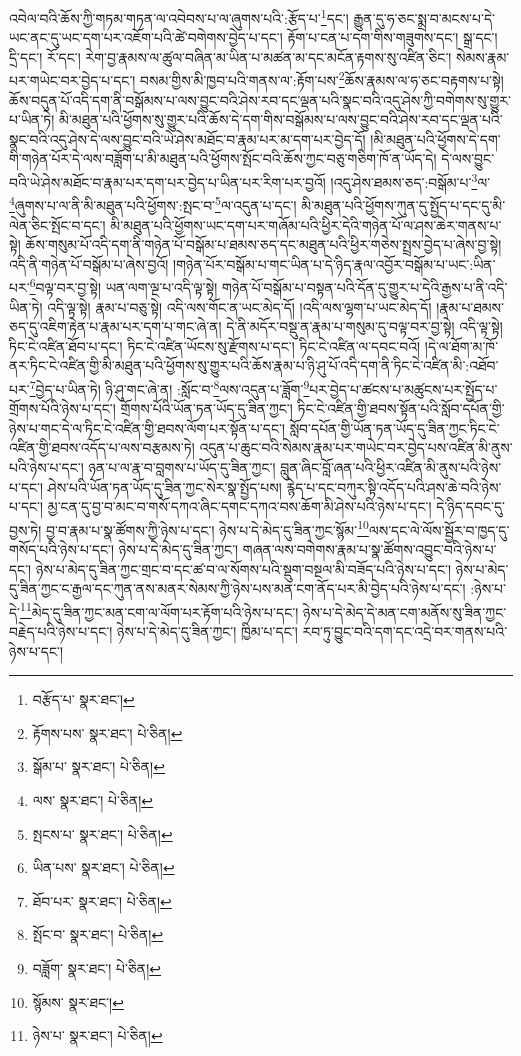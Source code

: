 འབེལ་བའི་ཆོས་ཀྱི་གཏམ་གཏན་ལ་འབེབས་པ་ལ་ཞུགས་པའི་:རྩོད་པ་\footnote{བརྩོད་པ་  སྣར་ཐང་། }དང་། རྒྱུན་དུ་ཧ་ཅང་སྨྲ་བ་མངས་པ་དེ་ཡང་ནང་དུ་ཡང་དག་པར་འཇོག་པའི་ཚེ་བགེགས་བྱེད་པ་དང་། རྟོག་པ་ངན་པ་དག་གིས་གཟུགས་དང་། སྒྲ་དང་། དྲི་དང་། རོ་དང་། རེག་བྱ་རྣམས་ལ་ཚུལ་བཞིན་མ་ཡིན་པ་མཚན་མ་དང་མངོན་རྟགས་སུ་འཛིན་ཅིང་། སེམས་རྣམ་པར་གཡེང་བར་བྱེད་པ་དང་། བསམ་གྱིས་མི་ཁྱབ་པའི་གནས་ལ་:རྟོག་པས་\footnote{རྟོགས་པས་  སྣར་ཐང་།  པེ་ཅིན། }ཆོས་རྣམས་ལ་ཧ་ཅང་བརྟགས་པ་སྟེ། ཆོས་བདུན་པོ་འདི་དག་ནི་བསྒོམས་པ་ལས་བྱུང་བའི་ཤེས་རབ་དང་ལྡན་པའི་སྣང་བའི་འདུ་ཤེས་ཀྱི་བགེགས་སུ་གྱུར་པ་ཡིན་ཏེ། མི་མཐུན་པའི་ཕྱོགས་སུ་གྱུར་པའི་ཆོས་དེ་དག་གིས་བསྒོམས་པ་ལས་བྱུང་བའི་ཤེས་རབ་དང་ལྡན་པའི་སྣང་བའི་འདུ་ཤེས་དེ་ལས་བྱུང་བའི་ཡེ་ཤེས་མཐོང་བ་རྣམ་པར་མ་དག་པར་བྱེད་དོ། །མི་མཐུན་པའི་ཕྱོགས་དེ་དག་གི་གཉེན་པོར་དེ་ལས་བཟློག་པ་མི་མཐུན་པའི་ཕྱོགས་སྤོང་བའི་ཆོས་ཀྱང་བཅུ་གཅིག་ཁོ་ན་ཡོད་དེ། དེ་ལས་བྱུང་བའི་ཡེ་ཤེས་མཐོང་བ་རྣམ་པར་དག་པར་བྱེད་པ་ཡིན་པར་རིག་པར་བྱའོ། །འདུ་ཤེས་ཐམས་ཅད་:བསྒོམ་པ་\footnote{སྒོམ་པ་  སྣར་ཐང་།  པེ་ཅིན། }ལ་\footnote{ལས་  སྣར་ཐང་།  པེ་ཅིན། }ཞུགས་པ་ལ་ནི་མི་མཐུན་པའི་ཕྱོགས་:སྤང་བ་\footnote{སྤངས་པ་  སྣར་ཐང་།  པེ་ཅིན། }ལ་འདུན་པ་དང་། མི་མཐུན་པའི་ཕྱོགས་ཀུན་དུ་སྤྱོད་པ་དང་དུ་མི་ལེན་ཅིང་སྤོང་བ་དང་། མི་མཐུན་པའི་ཕྱོགས་ཡང་དག་པར་གཞོམ་པའི་ཕྱིར་དེའི་གཉེན་པོ་ལ་ཤས་ཆེར་གནས་པ་སྟེ། ཆོས་གསུམ་པོ་འདི་དག་ནི་གཉེན་པོ་བསྒོམ་པ་ཐམས་ཅད་དང་མཐུན་པའི་ཕྱིར་གཅེས་སྤྲས་བྱེད་པ་ཞེས་བྱ་སྟེ། འདི་ནི་གཉེན་པོ་བསྒོམ་པ་ཞེས་བྱའོ། །གཉེན་པོར་བསྒོམ་པ་གང་ཡིན་པ་དེ་ཉིད་རྣལ་འབྱོར་བསྒོམ་པ་ཡང་:ཡིན་པར་\footnote{ཡིན་པས་  སྣར་ཐང་།  པེ་ཅིན། }བལྟ་བར་བྱ་སྟེ། ཡན་ལག་ལྔ་པ་འདི་ལྟ་སྟེ། གཉེན་པོ་བསྒོམ་པ་བསྟན་པའི་དོན་དུ་གྱུར་པ་དེའི་རྒྱས་པ་ནི་འདི་ཡིན་ཏེ། འདི་ལྟ་སྟེ། རྣམ་པ་བཅུ་སྟེ། འདི་ལས་གོང་ན་ཡང་མེད་དོ། །འདི་ལས་ལྷག་པ་ཡང་མེད་དོ། །རྣམ་པ་ཐམས་ཅད་དུ་འཇིག་རྟེན་པ་རྣམ་པར་དག་པ་གང་ཞེ་ན། དེ་ནི་མདོར་བསྡུ་ན་རྣམ་པ་གསུམ་དུ་བལྟ་བར་བྱ་སྟེ། འདི་ལྟ་སྟེ། ཏིང་ངེ་འཛིན་ཐོབ་པ་དང་། ཏིང་ངེ་འཛིན་ཡོངས་སུ་རྫོགས་པ་དང་། ཏིང་ངེ་འཛིན་ལ་དབང་བའོ། །དེ་ལ་ཐོག་མ་ཁོ་ནར་ཏིང་ངེ་འཛིན་གྱི་མི་མཐུན་པའི་ཕྱོགས་སུ་གྱུར་པའི་ཆོས་རྣམ་པ་ཉི་ཤུ་པོ་འདི་དག་ནི་ཏིང་ངེ་འཛིན་མི་:འཐོབ་པར་\footnote{ཐོབ་པར་  སྣར་ཐང་།  པེ་ཅིན། }བྱེད་པ་ཡིན་ཏེ། ཉི་ཤུ་གང་ཞེ་ན། :སློང་བ་\footnote{སྤོང་བ་  སྣར་ཐང་།  པེ་ཅིན། }ལས་འདུན་པ་ཟློག་\footnote{བཟློག་  སྣར་ཐང་།  པེ་ཅིན། }པར་བྱེད་པ་ཚངས་པ་མཚུངས་པར་སྤྱོད་པ་གྲོགས་པོའི་ཉེས་པ་དང་། གྲོགས་པོའི་ཡོན་ཏན་ཡོད་དུ་ཟིན་ཀྱང་། ཏིང་ངེ་འཛིན་གྱི་ཐབས་སྟོན་པའི་སློབ་དཔོན་གྱི་ཉེས་པ་གང་དེ་ལ་ཏིང་ངེ་འཛིན་གྱི་ཐབས་ལོག་པར་སྟོན་པ་དང་། སློབ་དཔོན་གྱི་ཡོན་ཏན་ཡོད་དུ་ཟིན་ཀྱང་ཏིང་ངེ་འཛིན་གྱི་ཐབས་འདོད་པ་ལས་བརྩམས་ཏེ། འདུན་པ་ཆུང་བའི་སེམས་རྣམ་པར་གཡེང་བར་བྱེད་པས་འཛིན་མི་ནུས་པའི་ཉེས་པ་དང་། ཉན་པ་ལ་རྣ་བ་བླགས་པ་ཡོད་དུ་ཟིན་ཀྱང་། བླུན་ཞིང་བློ་ཞན་པའི་ཕྱིར་འཛིན་མི་ནུས་པའི་ཉེས་པ་དང་། ཤེས་པའི་ཡོན་ཏན་ཡོད་དུ་ཟིན་ཀྱང་སེར་སྣ་སྤྱོད་པས། རྙེད་པ་དང་བཀུར་སྟི་འདོད་པའི་ཤས་ཆེ་བའི་ཉེས་པ་དང་། མྱ་ངན་དུ་བྱ་བ་མང་བ་གསོ་དཀའ་ཞིང་དགང་དཀའ་བས་ཆོག་མི་ཤེས་པའི་ཉེས་པ་དང་། དེ་ཉིད་དབང་དུ་བྱས་ཏེ། བྱ་བ་རྣམ་པ་སྣ་ཚོགས་ཀྱི་ཉེས་པ་དང་། ཉེས་པ་དེ་མེད་དུ་ཟིན་ཀྱང་སྙོམ་\footnote{སྙོམས་  སྣར་ཐང་། }ལས་དང་ལེ་ལོས་སྦྱོར་བ་ཁྱད་དུ་གསོད་པའི་ཉེས་པ་དང་། ཉེས་པ་དེ་མེད་དུ་ཟིན་ཀྱང་། གཞན་ལས་བགེགས་རྣམ་པ་སྣ་ཚོགས་འབྱུང་བའི་ཉེས་པ་དང་། ཉེས་པ་མེད་དུ་ཟིན་ཀྱང་གྲང་བ་དང་ཚ་བ་ལ་སོགས་པའི་སྡུག་བསྔལ་མི་བཟོད་པའི་ཉེས་པ་དང་། ཉེས་པ་མེད་དུ་ཟིན་ཀྱང་ང་རྒྱལ་དང་ཀུན་ནས་མནར་སེམས་ཀྱི་ཉེས་པས་མན་ངག་ནོད་པར་མི་བྱེད་པའི་ཉེས་པ་དང་། :ཉེས་པ་དེ་\footnote{ཉེས་པ་  སྣར་ཐང་།  པེ་ཅིན། }མེད་དུ་ཟིན་ཀྱང་མན་ངག་ལ་ལོག་པར་རྟོག་པའི་ཉེས་པ་དང་། ཉེས་པ་དེ་མེད་དེ་མན་ངག་མནོས་སུ་ཟིན་ཀྱང་བརྗེད་པའི་ཉེས་པ་དང་། ཉེས་པ་དེ་མེད་དུ་ཟིན་ཀྱང་། ཁྱིམ་པ་དང་། རབ་ཏུ་བྱུང་བའི་དག་དང་འདྲེ་བར་གནས་པའི་ཉེས་པ་དང་། 
